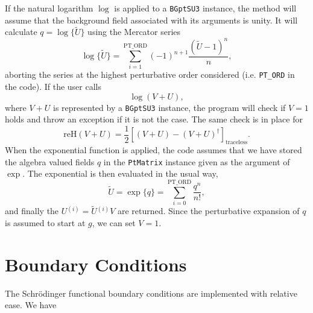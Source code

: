 \documentclass[a4paper]{scrartcl}
\newcommand{\ord}[1]{\ensuremath{^{(#1)}}}
\begin{document}
If the natural logarithm $\log$ is applied to a \texttt{BGptSU3}
instance, the method will assume that the background field associated
with its arguments is unity. It will calculate $q = \log \{\tilde U\}$
using the Mercator series
%
\begin{equation}
  \label{eq:13}
  \log \{\tilde U\} = \sum_{i=1}^{\mathrm{PT\_ORD}} 
  (-1)^{n+1} \frac {(\tilde U - 1)^n} n,
\end{equation}
%
aborting the series at the highest perturbative order considered
(i.e. \texttt{PT\_ORD} in the code). If the user calls
%
\begin{equation}
  \label{eq:19}
  \log(V + U),
\end{equation}
%
where $V + U$ is represented by a \texttt{BGptSU3} instance, the
program will check if $V = 1$ holds and throw an exception if it is
not the case. The same check is in place for
%
\begin{equation}
  \label{eq:20}
  \mathrm{reH}(V + U) = \frac 1 2 \left[ (V + U) - (V + U)^\dagger
    \right]_{\mathrm{traceless}}.
\end{equation}
%
When the exponential function is applied, the code assumes that we
have stored the algebra valued fields $q$ in the \texttt{PtMatrix}
instance given as the argument of $\exp$. The exponential
is then evaluated in the usual way,
%
\begin{equation}
  \label{eq:14}
  \tilde U = \exp \{ q\} = \sum_{i = 0}^{\mathrm{PT\_ORD}} \frac {q^n}{n!},
\end{equation}
%
and finally the $U\ord i = {\tilde U}\ord i V$ are returned. Since the
perturbative expansion of $q$ is assumed to start at $g$, we can set
$V = 1$.

\section{Boundary Conditions}
\label{sec:boundary-conditions}

The Schrödinger functional boundary conditions are implemented with
relative ease. We have
\end{document}
